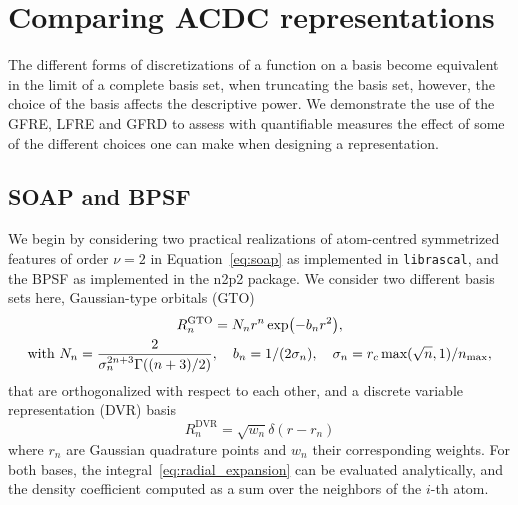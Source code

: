 \section{Comparing ACDC representations}

The different forms of discretizations of a function on a basis become equivalent in the limit of a complete basis set, when truncating the basis set, however, the choice of the basis affects the descriptive power.
We demonstrate the use of the GFRE, LFRE and GFRD to assess with quantifiable measures the effect of some of the different choices one can make when designing a representation.

\subsection{SOAP and BPSF}
\label{sub:hypers}
We begin by considering two practical realizations of atom-centred symmetrized features of order $\nu=2$ in Equation~\eqref{eq:soap} as implemented in \texttt{librascal}\cite{LIBRASCAL}, and the BPSF\cite{behl11jcp} as implemented in the n2p2 package\cite{singraber2019parallel}. 
We consider two different basis sets here, Gaussian-type orbitals (GTO)
\begin{subequations}
\begin{gather}
  R_n^\textrm{GTO} = N_n r^{n}\exp(-b_nr^2),\\
\text{with }N_n=\frac2{\sigma_n^{2n+3}\Gamma((n+3)/2)},\quad b_n = 1/(2\sigma_n),\quad \sigma_n = r_c\,\textrm{max}(\sqrt{n},1)/n_\mathrm{max},
\end{gather}
\end{subequations}
that are orthogonalized with respect to each other,
and a discrete variable representation (DVR) basis
\begin{equation}
R_n^\textrm{DVR}= \sqrt{w_n}\delta(r-r_n)
\end{equation}
where $r_n$ are Gaussian quadrature points and $w_n$ their corresponding weights.
For both bases, the integral~\eqref{eq:radial_expansion} can be evaluated analytically, and the density coefficient computed as a sum over the neighbors of the $i$-th atom.


